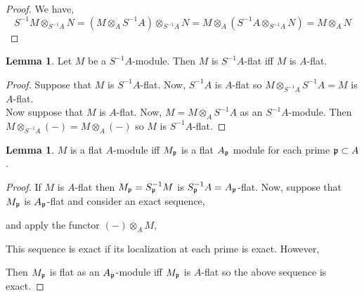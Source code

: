 \documentclass[12pt]{extarticle}
\theoremstyle{definition}
\newtheorem{lemma}[theorem]{Lemma}
\begin{document}
\begin{proof}
We have,
\[ S^{-1} M \otimes_{S^{-1} A} N = (M \otimes_A S^{-1}A) \otimes_{S^{-1} A} N = M \otimes_A (S^{-1} A \otimes_{S^{-1} A} N) = M \otimes_A N \]
\end{proof}

\begin{lemma}
Let $M$ be a $S^{-1}A$-module. Then $M$ is $S^{-1} A$-flat iff $M$ is $A$-flat.
\end{lemma}

\begin{proof}
Suppose that $M$ is $S^{-1} A$-flat. Now, $S^{-1} A$ is $A$-flat so $M \otimes_{S^{-1} A} S^{-1} A = M$ is $A$-flat.
\bigskip\\
Now suppose that $M$ is $A$-flat. Now, $M = M \otimes_{A} S^{-1} A$ as an $S^{-1} A$-module. Then $M \otimes_{S^{-1} A} (-) = M \otimes_{A} (-)$ so $M$ is $S^{-1}A$-flat.
\end{proof}

\begin{lemma}
$M$ is a flat $A$-module iff $M_{\mathfrak{p}}$ is a flat $A_{\mathfrak{p}}$ module for each prime $\mathfrak{p} \subset A$. 
\end{lemma}

\begin{proof}
If $M$ is $A$-flat then $M_{\mathfrak{p}} = S_{\mathfrak{p}}^{-1} M$ is $S^{-1}_{\mathfrak{p}} A = A_{\mathfrak{p}}$-flat. Now, suppose that $M_{\mathfrak{p}}$ is $A_{\mathfrak{p}}$-flat and consider an exact sequence,
\begin{center}
\end{center}
and apply the functor $(-) \otimes_A M$,
\begin{center}
\end{center}
This sequence is exact if its localization at each prime is exact. However,
\begin{center}
\end{center}
Then $M_{\mathfrak{p}}$ is flat as an $A_{\mathfrak{p}}$-module iff $M_{\mathfrak{p}}$ is $A$-flat so the above sequence is exact. 
\end{proof}
\end{document}
